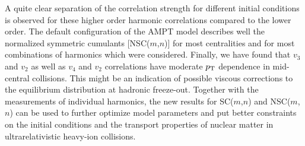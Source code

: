 A quite clear separation of the correlation strength for different initial conditions is observed for these higher order harmonic correlations compared to the lower order.
The default configuration of the AMPT model describes well the normalized symmetric cumulants [NSC($m$,$n$)] for most centralities and for most combinations of harmonics which were considered. 
Finally, we have found that $v_3$ and $v_2$ as well as $v_4$ and $v_2$ correlations have moderate $p_{\rm T}$ dependence in mid-central collisions. This might be an indication of possible viscous corrections to the equilibrium distribution at hadronic freeze-out.
Together with the measurements of individual harmonics, the new results for SC($m$,$n$) and NSC($m$,$n$) can be used to further optimize model parameters and put better constraints on the initial conditions and the transport properties of nuclear matter in ultrarelativistic heavy-ion collisions.





